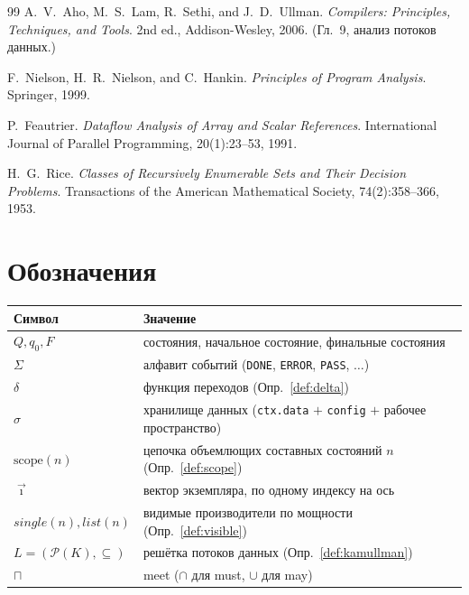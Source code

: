 \documentclass[11pt]{article}
\theoremstyle{plain}
\theoremstyle{definition}
\theoremstyle{remark}
\newcommand{\code}[1]{\texttt{#1}}
\newcommand{\transition}{\ensuremath{\delta}}
\newcommand{\powerset}{\mathcal{P}}
\newcommand{\meet}{\sqcap}
\begin{document}
\begin{thebibliography}{99}
 A.~V.~Aho, M.~S.~Lam, R.~Sethi, and J.~D.~Ullman.
\emph{Compilers: Principles, Techniques, and Tools}. 2nd ed., Addison-Wesley, 2006.
(Гл.~9, анализ потоков данных.)

 F.~Nielson, H.~R.~Nielson, and C.~Hankin.
\emph{Principles of Program Analysis}. Springer, 1999.

 P.~Feautrier.
\emph{Dataflow Analysis of Array and Scalar References}.
International Journal of Parallel Programming, 20(1):23--53, 1991.

 H.~G.~Rice.
\emph{Classes of Recursively Enumerable Sets and Their Decision Problems}.
Transactions of the American Mathematical Society, 74(2):358--366, 1953.

\end{thebibliography}

\appendix
\section{Обозначения}
\begin{center}\small
\begin{tabular}{@{}ll@{}}
\toprule
Символ & Значение \\
\midrule
$Q, q_0, F$ & состояния, начальное состояние, финальные состояния \\
$\Sigma$ & алфавит событий (\code{DONE}, \code{ERROR}, \code{PASS}, $\dots$) \\
$\transition$ & функция переходов (Опр.~\ref{def:delta}) \\
$\sigma$ & хранилище данных (\code{ctx.data} $+$ \code{config} $+$ рабочее пространство) \\
$\mathrm{scope}(n)$ & цепочка объемлющих составных состояний $n$ (Опр.~\ref{def:scope}) \\
$\vec{\imath}$ & вектор экземпляра, по одному индексу на ось \\
$\mathit{single}(n), \mathit{list}(n)$ & видимые производители по мощности (Опр.~\ref{def:visible}) \\
$L = (\powerset(K), \subseteq)$ & решётка потоков данных (Опр.~\ref{def:kamullman}) \\
$\meet$ & meet ($\cap$ для must, $\cup$ для may) \\
\bottomrule
\end{tabular}
\end{center}
\end{document}
